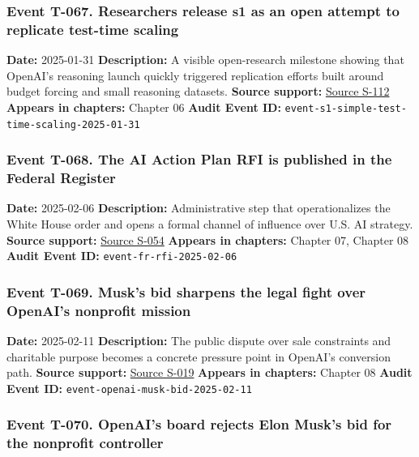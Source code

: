 \documentclass[
  american,
  11pt,
  letterpaper,
]{article}
\begin{document}
\subsubsection{Event T-067. Researchers release s1 as an open attempt to
replicate test-time
scaling}\label{event-t-067-researchers-release-s1-as-an-open-attempt-to-replicate-test-time-scaling}

\textbf{Date:} 2025-01-31 \textbf{Description:} A visible open-research
milestone showing that OpenAI's reasoning launch quickly triggered
replication efforts built around budget forcing and small reasoning
datasets. \textbf{Source support:}
\hyperref[source-s-112-s1-simple-test-time-scaling]{Source S-112}
\textbf{Appears in chapters:} Chapter 06 \textbf{Audit Event ID:}
\texttt{event-s1-simple-test-time-scaling-2025-01-31}

\subsubsection{Event T-068. The AI Action Plan RFI is published in the
Federal
Register}\label{event-t-068-the-ai-action-plan-rfi-is-published-in-the-federal-register}

\textbf{Date:} 2025-02-06 \textbf{Description:} Administrative step that
operationalizes the White House order and opens a formal channel of
influence over U.S. AI strategy. \textbf{Source support:}
\hyperref[source-s-054-request-for-information-on-the-development-of-an-artificial-intelligence-ai-action-plan]{Source
S-054} \textbf{Appears in chapters:} Chapter 07, Chapter 08
\textbf{Audit Event ID:} \texttt{event-fr-rfi-2025-02-06}

\subsubsection{Event T-069. Musk's bid sharpens the legal fight over
OpenAI's nonprofit
mission}\label{event-t-069-musk-s-bid-sharpens-the-legal-fight-over-openai-s-nonprofit-mission}

\textbf{Date:} 2025-02-11 \textbf{Description:} The public dispute over
sale constraints and charitable purpose becomes a concrete pressure
point in OpenAI's conversion path. \textbf{Source support:}
\hyperref[source-s-019-how-elon-musk-97-4-billion-bid-complicates-matters-for-openai]{Source
S-019} \textbf{Appears in chapters:} Chapter 08 \textbf{Audit Event ID:}
\texttt{event-openai-musk-bid-2025-02-11}

\subsubsection{Event T-070. OpenAI's board rejects Elon Musk's bid for
the nonprofit
controller}\label{event-t-070-openai-s-board-rejects-elon-musk-s-bid-for-the-nonprofit-controller}
\end{document}

